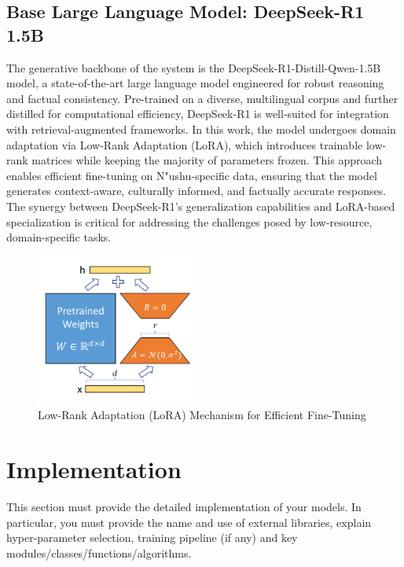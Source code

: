 \documentclass{article}
\begin{document}
\subsection{Base Large Language Model: DeepSeek-R1 1.5B}
\label{ssec:deepseek_model}
    The generative backbone of the system is the DeepSeek-R1-Distill-Qwen-1.5B model, a state-of-the-art large language model engineered for robust reasoning and factual consistency. Pre-trained on a diverse, multilingual corpus and further distilled for computational efficiency, DeepSeek-R1 is well-suited for integration with retrieval-augmented frameworks. In this work, the model undergoes domain adaptation via Low-Rank Adaptation (LoRA), which introduces trainable low-rank matrices while keeping the majority of parameters frozen. This approach enables efficient fine-tuning on N"{u}shu-specific data, ensuring that the model generates context-aware, culturally informed, and factually accurate responses. The synergy between DeepSeek-R1's generalization capabilities and LoRA-based specialization is critical for addressing the challenges posed by low-resource, domain-specific tasks.
    
    \begin{figure}[htb]
    \centering
    \includegraphics[width=0.48\textwidth]{images/Lora.png}
    \caption{Low-Rank Adaptation (LoRA) Mechanism for Efficient Fine-Tuning}
    \label{fig:lora_mechanism}
    \end{figure}













    
\section{Implementation}
\label{sec:impl}
    This section must provide the detailed implementation of your models. In particular, you must provide the name and use of external libraries, explain hyper-parameter selection, training pipeline (if any) and key modules/classes/functions/algorithms.
    
\end{document}
